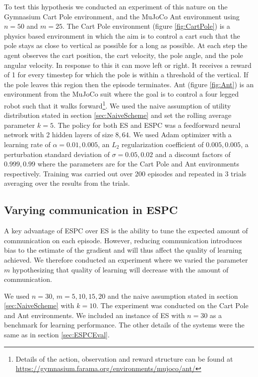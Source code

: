 To test this hypothesis we conducted an experiment of this nature on the Gymnasium Cart Pole environment, and the MuJoCo Ant environment 
using $n=50$ and $m=25$.
The Cart Pole environment (figure \ref{fig:CartPole}) is a physics based environment in which the aim is to control a cart such that the pole stays as close to vertical as possible for a long as possible. 
At each step the agent observes the cart position, the cart velocity, the pole angle, and the pole angular velocity. In response to this it can move left or right. 
It receives a reward of 1 for every timestep for which the pole is within a threshold of the vertical. If the pole leaves this region then the episode terminates. Ant (figure \ref{fig:Ant}) is an environment from the MuJoCo suit where the goal is to control a four legged robot such that it walks forward\footnote{Details of the action, observation and reward structure can be found at \url{https://gymnasium.farama.org/environments/mujoco/ant/}}. We used the naive assumption of utility distribution stated in section \ref{sec:NaiveScheme} and set the rolling average parameter $k=5$. The policy for both ES and ESPC was a feedforward neural network with 2 hidden layers of size $8,64$. We used Adam optimizer \cite{Adam} with a learning rate of $\alpha=0.01,0.005$, an $L_2$ regularization coefficient of $0.005,0.005$, a perturbation standard deviation of $\sigma=0.05,0.02$ and a discount factors of $0.999,0.99$ where the parameters are for the Cart Pole and Ant environments respectively. Training was carried out over 200 episodes and repeated in 3 trials averaging over the results from the trials.
\label{sec:ESPCEval}

\subsection{Varying communication in ESPC}
A key advantage of ESPC over ES is the ability to tune the expected amount of communication on each episode. However, reducing communication introduces bias to the estimate of the gradient and will thus affect the quality of learning achieved. We therefore conducted an experiment where we varied the parameter $m$ hypothesizing that quality of learning will decrease with the amount of communication.

We used $n=30$, $m=5,10,15,20$ and the naive assumption stated in section \ref{sec:NaiveScheme} with $k=10$. The experiment was conducted on the Cart Pole and Ant environments. We included an instance of ES with $n=30$ as a benchmark for learning performance. The other details of the systems were the same as in section \ref{sec:ESPCEval}.

